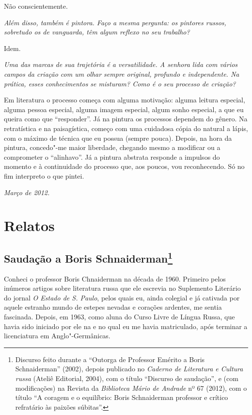 {{{Não conscientemente.

\medskip

\emph{Além disso, também é pintora. Faço a mesma pergunta: os pintores
russos, sobretudo os de vanguarda, têm algum reflexo no seu trabalho?}

Idem.

\medskip

\emph{Uma das marcas de sua trajetória é a versatilidade. A senhora lida
com vários campos da criação com um olhar sempre original, profundo e
independente. Na prática, esses conhecimentos se misturam? Como é o seu
processo de criação?}

Em literatura o processo começa com alguma motivação: alguma leitura
especial, alguma pessoa especial, alguma imagem especial, algum sonho
especial, a que eu queira como que ``responder''. Já na pintura os
processos dependem do gênero. Na retratística e na paisagística, começo
com uma cuidadosa cópia do natural a lápis, com o máximo de técnica que
eu possua (sempre pouca). Depois, na hora da pintura, concedo"-me maior
liberdade, chegando mesmo a modificar ou a comprometer o ``alinhavo''.
Já a pintura abstrata responde a impulsos do momento e à continuidade do
processo que, aos poucos, vou reconhecendo. Só no fim interpreto o que
pintei.

\begin{flushright}
\emph{Março de 2012.}
\end{flushright}

\part{Relatos}

\chapter{Saudação a Boris Schnaiderman\footnote{Discurso feito durante a
  ``Outorga de Professor Emérito a Boris Schnaiderman'' (2002), depois
  publicado no \emph{Caderno de Literatura e Cultura russa} (Ateliê
  Editorial, 2004), com o título ``Discurso de saudação'', e (com
 modificações) na Revista da \emph{Biblioteca Mário de
  Andrade} nº 67 (2012), com o título ``A coragem e o equilíbrio: Boris
  Schnaiderman professor e crítico refratário às paixões súbitas''.}}

Conheci o professor Boris Chnaiderman na década de 1960. Primeiro pelos
inúmeros artigos sobre literatura russa que ele escrevia no Suplemento
Literário do jornal \emph{O Estado de S. Paulo}, pelos quais eu, ainda
colegial e já cativada por aquele estranho mundo de estepes nevadas e
corações ardentes, me sentia fascinada. Depois, em 1963, como aluna do
Curso Livre de Língua Russa, que havia sido iniciado por ele na  e no
qual eu me havia matriculado, após terminar a licenciatura em
Anglo"-Germânicas.

}}}

